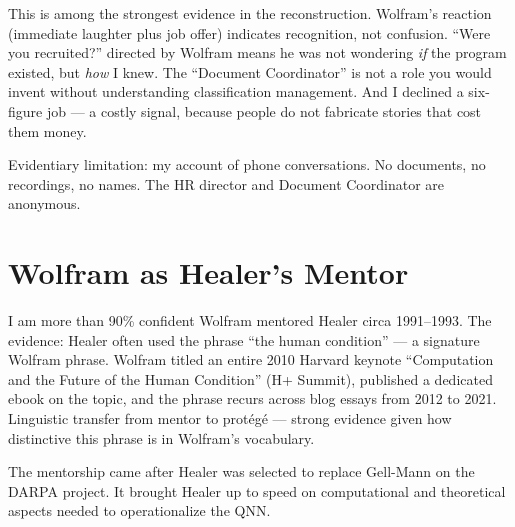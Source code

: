 This is among the strongest evidence in the reconstruction. Wolfram's reaction (immediate laughter plus job offer) indicates recognition, not confusion. ``Were you recruited?'' directed by Wolfram means he was not wondering \textit{if} the program existed, but \textit{how} I knew. The ``Document Coordinator'' is not a role you would invent without understanding classification management. And I declined a six-figure job --- a costly signal, because people do not fabricate stories that cost them money.

Evidentiary limitation: my account of phone conversations. No documents, no recordings, no names. The HR director and Document Coordinator are anonymous.

\section*{Wolfram as Healer's Mentor}
\label{pos31:wolfram-as-healers-mentor}


I am more than 90\% confident Wolfram mentored Healer circa 1991--1993. The evidence: Healer often used the phrase ``the human condition'' --- a signature Wolfram phrase. Wolfram titled an entire 2010 Harvard keynote ``Computation and the Future of the Human Condition'' (H+ Summit), published a dedicated ebook on the topic, and the phrase recurs across blog essays from 2012 to 2021. Linguistic transfer from mentor to prot\'eg\'e --- strong evidence given how distinctive this phrase is in Wolfram's vocabulary.

The mentorship came after Healer was selected to replace Gell-Mann on the DARPA project. It brought Healer up to speed on computational and theoretical aspects needed to operationalize the QNN\@.

\chapterreturn

